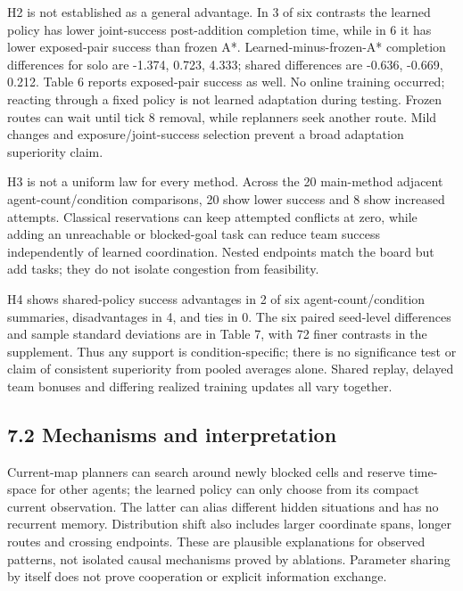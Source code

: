 \documentclass[10pt,a4paper]{article}
\begin{document}
H2 is not established as a general advantage. In 3 of six contrasts the learned policy has lower joint-success post-addition completion time, while in 6 it has lower exposed-pair success than frozen A*. Learned-minus-frozen-A* completion differences for solo are -1.374, 0.723, 4.333; shared differences are -0.636, -0.669, 0.212. Table 6 reports exposed-pair success as well. No online training occurred; reacting through a fixed policy is not learned adaptation during testing. Frozen routes can wait until tick 8 removal, while replanners seek another route. Mild changes and exposure/joint-success selection prevent a broad adaptation superiority claim.



H3 is not a uniform law for every method. Across the 20 main-method adjacent agent-count/condition comparisons, 20 show lower success and 8 show increased attempts. Classical reservations can keep attempted conflicts at zero, while adding an unreachable or blocked-goal task can reduce team success independently of learned coordination. Nested endpoints match the board but add tasks; they do not isolate congestion from feasibility.



H4 shows shared-policy success advantages in 2 of six agent-count/condition summaries, disadvantages in 4, and ties in 0. The six paired seed-level differences and sample standard deviations are in Table 7, with 72 finer contrasts in the supplement. Thus any support is condition-specific; there is no significance test or claim of consistent superiority from pooled averages alone. Shared replay, delayed team bonuses and differing realized training updates all vary together.



\subsection*{7.2 Mechanisms and interpretation}



Current-map planners can search around newly blocked cells and reserve time-space for other agents; the learned policy can only choose from its compact current observation. The latter can alias different hidden situations and has no recurrent memory. Distribution shift also includes larger coordinate spans, longer routes and crossing endpoints. These are plausible explanations for observed patterns, not isolated causal mechanisms proved by ablations. Parameter sharing by itself does not prove cooperation or explicit information exchange.
\end{document}
